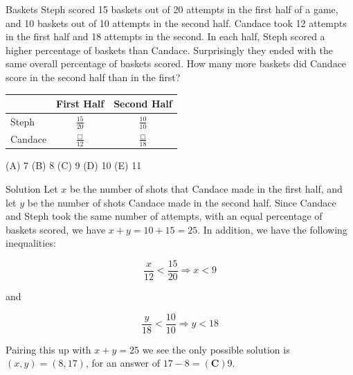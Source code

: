 \documentclass{beamer}
\theoremstyle{definition}
\newtheorem{theo}[defn]{Theorem}
\newtheorem{ques}[defn]{Question}
\newcommand{\bb}[1]{\mathbb{#1}}
\begin{document}
\begin{frame}{Baskets}
    Steph scored 15 baskets out of 20 attempts in the first half of a game, and 10 baskets out of 10 attempts in the second half. Candace took 12 attempts in the first half and 18 attempts in the second. In each half, Steph scored a higher percentage of baskets than Candace. Surprisingly they ended with the same overall percentage of baskets scored. How many more baskets did Candace score in the second half than in the first?
    
    \begin{tabular}{l|c|c} 
    & First Half & Second Half \\
    \hline Steph & $\frac{15}{20}$ & $\frac{10}{10}$ \\
    Candace & $\frac{\Box}{12}$ & $\frac{\Box}{18}$
    \end{tabular}
    
    (A) 7 (B) 8 (C) 9 (D) 10 (E) 11
\end{frame}
\begin{frame}{Solution}
    Let $x$ be the number of shots that Candace made in the first half, and let $y$ be the number of shots Candace made in the second half. Since Candace and Steph took the same number of attempts, with an equal percentage of baskets scored, we have $x+y=10+15=25$. In addition, we have the following inequalities:

$$
\frac{x}{12}<\frac{15}{20} \Longrightarrow x<9
$$

and

$$
\frac{y}{18}<\frac{10}{10} \Longrightarrow y<18
$$


Pairing this up with $x+y=25$ we see the only possible solution is $(x, y)=(8,17)$, for an answer of $17-8=(\mathbf{C}) 9$.
\end{frame}

    
\end{document}
